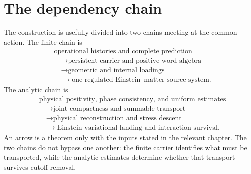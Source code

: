\documentclass[11pt,a4paper,oneside]{book}
\theoremstyle{plain}
\theoremstyle{definition}
\theoremstyle{remark}
\begin{document}
\section{The dependency chain}
The construction is usefully divided into two chains meeting at the common action. The finite chain is
\begin{equation}
\begin{aligned}
 &\text{operational histories and complete prediction}\\
 &\quad\longrightarrow\text{persistent carrier and positive word algebra}\\
 &\quad\longrightarrow\text{geometric and internal loadings}\\
 &\quad\longrightarrow\text{one regulated Einstein--matter source system}.
\end{aligned}
\label{eq:finite-chain}
\end{equation}
The analytic chain is
\begin{equation}
\begin{aligned}
 &\text{physical positivity, phase consistency, and uniform estimates}\\
 &\quad\longrightarrow\text{joint compactness and summable transport}\\
 &\quad\longrightarrow\text{physical reconstruction and stress descent}\\
 &\quad\longrightarrow\text{Einstein variational landing and interaction survival}.
\end{aligned}
\label{eq:analytic-chain}
\end{equation}
An arrow is a theorem only with the inputs stated in the relevant chapter. The two chains do not bypass one another: the finite carrier identifies what must be transported, while the analytic estimates determine whether that transport survives cutoff removal.
\end{document}
